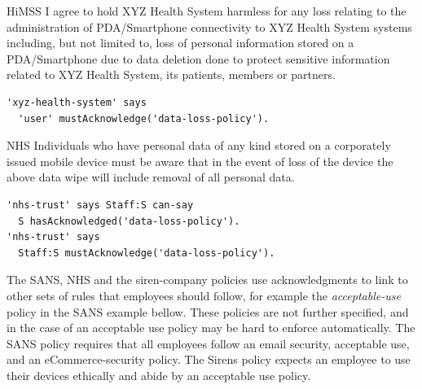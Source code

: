 \documentclass[thesis.tex]{subfiles}
\begin{document}
\begin{center}
  \noindent
    \begin{policyrule}{HiMSS}
      I agree to hold XYZ Health System harmless for any loss relating to the
      administration of PDA/Smartphone connectivity to XYZ Health System systems
      including, but not limited to, loss of personal information stored on a
      PDA/Smartphone due to data deletion done to protect sensitive information
      related to XYZ Health System, its patients, members or partners.
      \normalfont
      \begin{lstlisting}
'xyz-health-system' says
  'user' mustAcknowledge('data-loss-policy').
      \end{lstlisting}
    \end{policyrule}
    \begin{policyrule}{NHS}
      Individuals who have personal data of any kind stored on a corporately
      issued mobile device must be aware that in the event of loss of the device
      the above data wipe will include removal of all personal data.
      \normalfont
      \begin{lstlisting}
'nhs-trust' says Staff:S can-say
  S hasAcknowledged('data-loss-policy').
'nhs-trust' says
  Staff:S mustAcknowledge('data-loss-policy').
      \end{lstlisting}
    \end{policyrule}
\end{center}

The SANS, NHS and the siren-company policies use acknowledgments to
link to other sets of rules that employees should follow, for example
the \emph{acceptable-use} policy in the SANS example bellow.  These
policies are not further specified, and in the case of an acceptable
use policy may be hard to enforce automatically.  The SANS policy
requires that all employees follow an email security, acceptable use,
and an eCommerce-security policy.  The Sirens policy expects an
employee to use their devices ethically and abide by an acceptable use
policy.
\end{document}
